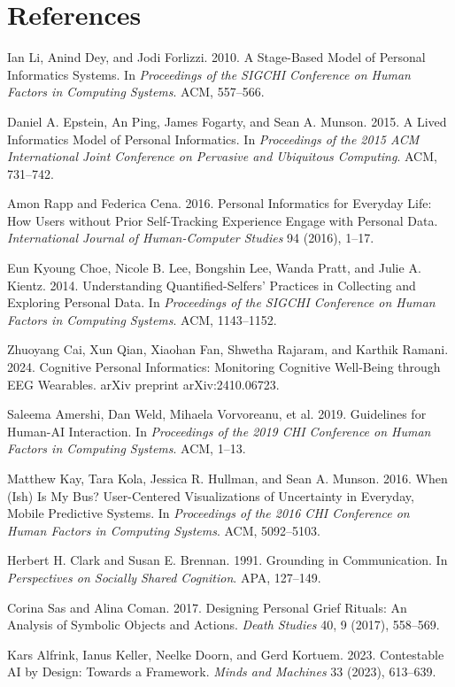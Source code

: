 \documentclass[10pt]{article}
\begin{document}
\section*{References}
\begin{enumerate}[label={[\arabic*]},leftmargin=2.2em,itemsep=2pt,topsep=2pt]
\item Ian Li, Anind Dey, and Jodi Forlizzi. 2010. A Stage-Based Model of Personal Informatics Systems. In \textit{Proceedings of the SIGCHI Conference on Human Factors in Computing Systems}. ACM, 557--566.
\item Daniel A. Epstein, An Ping, James Fogarty, and Sean A. Munson. 2015. A Lived Informatics Model of Personal Informatics. In \textit{Proceedings of the 2015 ACM International Joint Conference on Pervasive and Ubiquitous Computing}. ACM, 731--742.
\item Amon Rapp and Federica Cena. 2016. Personal Informatics for Everyday Life: How Users without Prior Self-Tracking Experience Engage with Personal Data. \textit{International Journal of Human-Computer Studies} 94 (2016), 1--17.
\item Eun Kyoung Choe, Nicole B. Lee, Bongshin Lee, Wanda Pratt, and Julie A. Kientz. 2014. Understanding Quantified-Selfers' Practices in Collecting and Exploring Personal Data. In \textit{Proceedings of the SIGCHI Conference on Human Factors in Computing Systems}. ACM, 1143--1152.
\item Zhuoyang Cai, Xun Qian, Xiaohan Fan, Shwetha Rajaram, and Karthik Ramani. 2024. Cognitive Personal Informatics: Monitoring Cognitive Well-Being through EEG Wearables. arXiv preprint arXiv:2410.06723.
\item Saleema Amershi, Dan Weld, Mihaela Vorvoreanu, et al. 2019. Guidelines for Human-AI Interaction. In \textit{Proceedings of the 2019 CHI Conference on Human Factors in Computing Systems}. ACM, 1--13.
\item Matthew Kay, Tara Kola, Jessica R. Hullman, and Sean A. Munson. 2016. When (Ish) Is My Bus? User-Centered Visualizations of Uncertainty in Everyday, Mobile Predictive Systems. In \textit{Proceedings of the 2016 CHI Conference on Human Factors in Computing Systems}. ACM, 5092--5103.
\item Herbert H. Clark and Susan E. Brennan. 1991. Grounding in Communication. In \textit{Perspectives on Socially Shared Cognition}. APA, 127--149.
\item Corina Sas and Alina Coman. 2017. Designing Personal Grief Rituals: An Analysis of Symbolic Objects and Actions. \textit{Death Studies} 40, 9 (2017), 558--569.
\item Kars Alfrink, Ianus Keller, Neelke Doorn, and Gerd Kortuem. 2023. Contestable AI by Design: Towards a Framework. \textit{Minds and Machines} 33 (2023), 613--639.
\end{enumerate}
\end{document}
